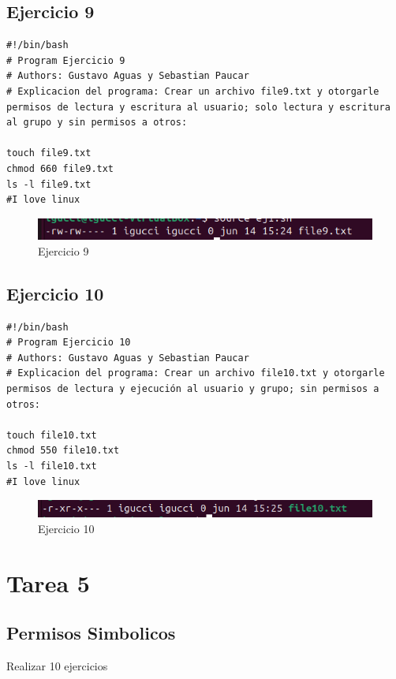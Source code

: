 \documentclass[11pt,twoside]{book}
\begin{document}
\subsection{Ejercicio 9}
\begin{lstlisting}
#!/bin/bash
# Program Ejercicio 9
# Authors: Gustavo Aguas y Sebastian Paucar
# Explicacion del programa: Crear un archivo file9.txt y otorgarle permisos de lectura y escritura al usuario; solo lectura y escritura al grupo y sin permisos a otros:

touch file9.txt
chmod 660 file9.txt
ls -l file9.txt
#I love linux
\end{lstlisting}
\begin{figure}
    \centering
    \includegraphics[width=1\linewidth]{pnum/ej9.png}
    \caption{Ejercicio 9}
\end{figure}
\newpage
\subsection{Ejercicio 10}

\begin{lstlisting}
#!/bin/bash
# Program Ejercicio 10
# Authors: Gustavo Aguas y Sebastian Paucar
# Explicacion del programa: Crear un archivo file10.txt y otorgarle permisos de lectura y ejecución al usuario y grupo; sin permisos a otros:

touch file10.txt
chmod 550 file10.txt
ls -l file10.txt
#I love linux
\end{lstlisting}
\begin{figure}
    \centering
    \includegraphics[width=1\linewidth]{pnum/ej10.png}
    \caption{Ejercicio 10}
\end{figure}
\newpage
\section{Tarea 5}
\subsection{Permisos Simbolicos}
Realizar 10 ejercicios
\end{document}
